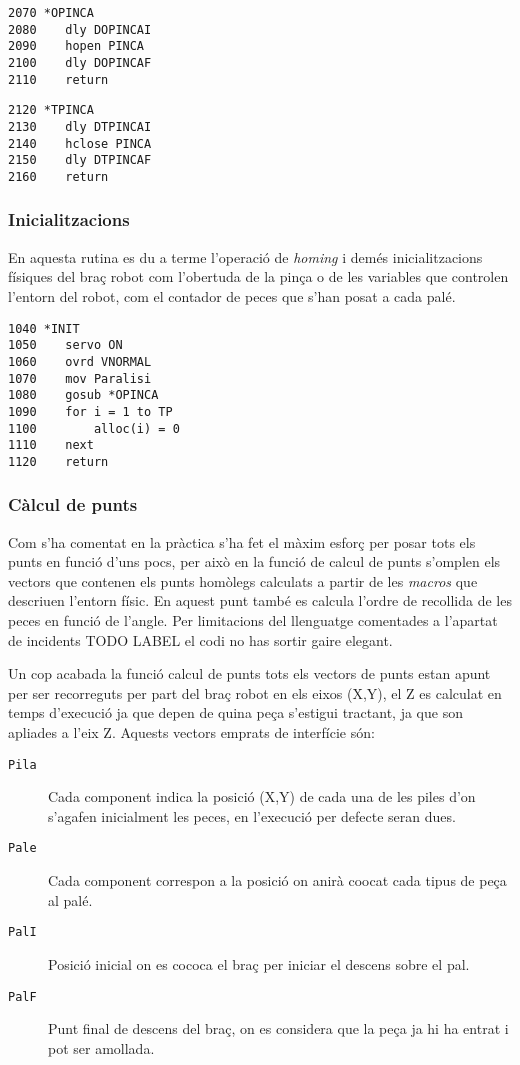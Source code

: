 \begin{verbatim}
2070 *OPINCA
2080    dly DOPINCAI
2090    hopen PINCA
2100    dly DOPINCAF
2110    return
\end{verbatim}
\begin{verbatim}
2120 *TPINCA
2130    dly DTPINCAI
2140    hclose PINCA
2150    dly DTPINCAF
2160    return
\end{verbatim}

\subsubsection{Inicialitzacions}
En aquesta rutina es du a terme l'operació de \emph{homing} i demés
inicialitzacions físiques del braç robot com l'obertuda de la pinça
o de les variables que controlen l'entorn del robot, com el 
contador de peces que s'han posat a cada palé.

\begin{verbatim}
1040 *INIT
1050    servo ON
1060    ovrd VNORMAL
1070    mov Paralisi
1080    gosub *OPINCA
1090    for i = 1 to TP
1100        alloc(i) = 0
1110    next
1120    return
\end{verbatim}

\subsubsection{Càlcul de punts}
Com s'ha comentat en la pràctica s'ha fet el màxim esforç per posar tots els punts en funció d'uns pocs,
per això en la funció de calcul de punts s'omplen els vectors que contenen els punts homòlegs calculats
a partir de les \emph{macros} que descriuen l'entorn físic. En aquest punt també es calcula l'ordre
de recollida de les peces en funció de l'angle. Per limitacions del llenguatge comentades a l'apartat
de incidents TODO LABEL el codi no has sortir gaire elegant.

Un cop acabada la funció calcul de punts tots els vectors de punts estan apunt per ser recorreguts
per part del braç robot en els eixos (X,Y), el Z es calculat en temps d'execució
ja que depen de quina peça s'estigui tractant, ja que son apliades a l'eix Z.
Aquests vectors emprats de interfície són:

\begin{description}
 \item [\texttt{Pila}] Cada component indica la posició (X,Y) de cada una de les piles d'on s'agafen
inicialment les peces, en l'execució per defecte seran dues.
 \item [\texttt{Pale}] Cada component correspon a la posició on anirà co\lgem ocat cada tipus de
peça al palé.
 \item [\texttt{PalI}] Posició inicial on es co\lgem coca el braç per iniciar el descens sobre el pal.
 \item [\texttt{PalF}] Punt final de descens del braç, on es considera que la peça ja hi ha entrat
i pot ser amollada.
\end{description}

